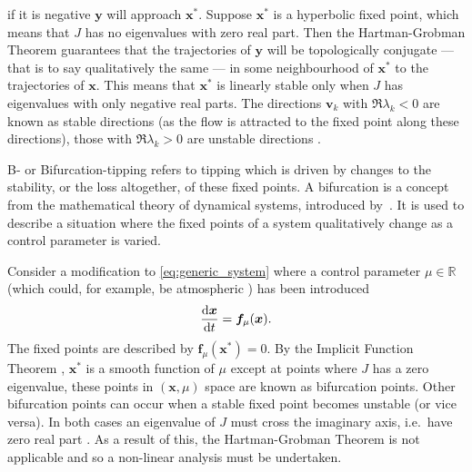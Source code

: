 if it is negative $\bm{y}$ will approach $\bm{x}^*$. Suppose $\bm{x}^*$ is a hyperbolic fixed point, which means that $J$ has no eigenvalues with zero real part. Then the Hartman-Grobman Theorem
\parencite{Grobman1959,Hartman1960,Hartman1963} guarantees that the trajectories of $\bm{y}$ will be topologically conjugate --- that is to say qualitatively the same --- in some
neighbourhood of $\bm{x}^*$ to the trajectories of $\bm{x}$.  This means that $\bm{x}^*$ is linearly stable only when $J$ has eigenvalues with only negative real parts.
The directions $\bm{v}_k$ with $\Re \lambda_k < 0$ are known as stable directions (as the flow is attracted to the fixed point along these directions),
those with $\Re \lambda_k > 0$ are unstable directions \parencite{Strogatz2015}.

B- or Bifurcation-tipping refers to tipping which is driven by changes to the stability, or the loss altogether, of these fixed points.
A bifurcation is a concept from the mathematical theory of dynamical systems, introduced by~\cite{Poincare1885}.
It is used to describe a situation where the fixed points of a system qualitatively change as a control parameter is varied.

Consider a modification to \cref{eq:generic_system} where a control parameter $\mu \in \mathbb{R}$ (which could, for example, be atmospheric ) has been introduced
\begin{equation}
  \label{eq:generic_system_control_parameter}
  \dv{\bm{x}}{t} = \bm{f}_{\mu}(\bm{x}).
\end{equation}
The fixed points are described by $\bm{f}_{\mu}(\bm{x}^*) = 0$. By the Implicit Function Theorem \parencite{Spivak1965}, $\bm{x}^*$ is a smooth
function of $\mu$ except at points where $J$ has a zero eigenvalue, these points in $(\bm{x},\mu)$ space are known as bifurcation points.
Other bifurcation points can occur when a stable fixed point becomes unstable (or vice versa). In both cases an eigenvalue of $J$ must cross the imaginary
axis, i.e.\ have zero real part \parencite{guckenheimer2013}. As a result of this, the Hartman-Grobman Theorem is not applicable and so a non-linear analysis must be undertaken.

